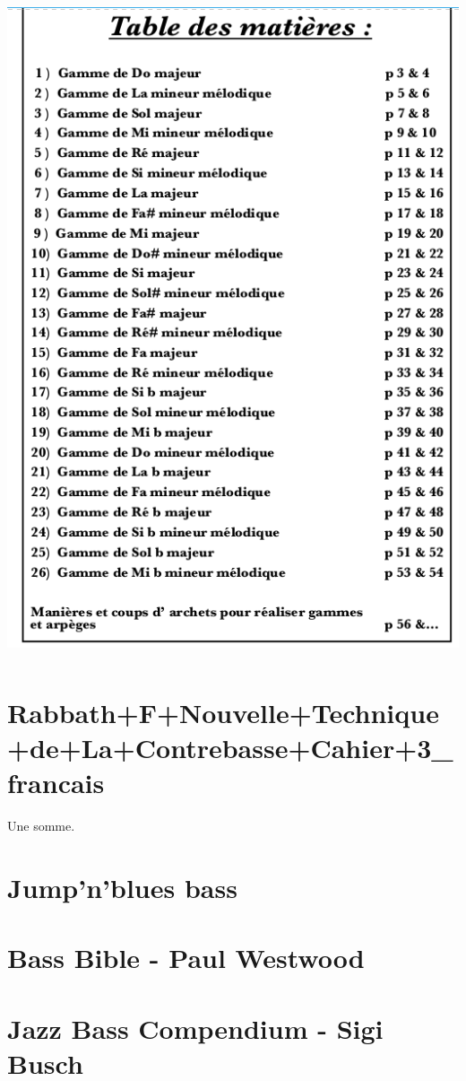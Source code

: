 \documentclass[a4paper]{book}
\begin{document}
\begin{center}
\includegraphics[width=13.651cm,height=19.338cm]{lebluessupportsmethodes-img179.png}
\end{center}
\clearpage\section{Rabbath+F+Nouvelle+Technique+de+La+Contrebasse+Cahier+3\_francais}
Une somme.
\clearpage\section{Jump'n'blues bass}
\clearpage\section{Bass Bible - Paul Westwood}
\clearpage\section{Jazz Bass Compendium - Sigi Busch}
\end{document}
